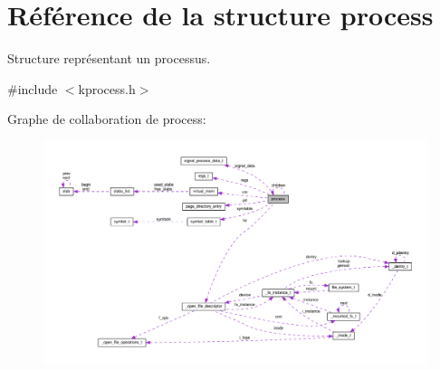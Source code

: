 \hypertarget{structprocess}{\section{Référence de la structure process}
\label{structprocess}
}


Structure représentant un processus.  




{\ttfamily \#include $<$kprocess.\+h$>$}



Graphe de collaboration de process\+:
\nopagebreak
\begin{figure}[H]
\begin{center}
\leavevmode
\includegraphics[width=350pt]{structprocess__coll__graph}
\end{center}
\end{figure}

